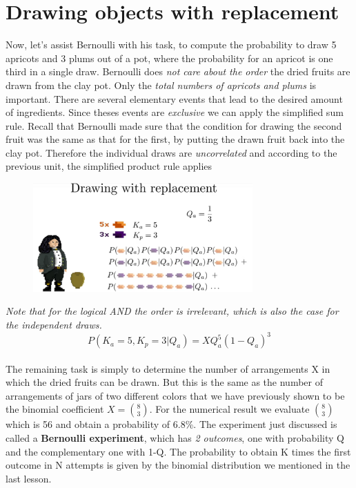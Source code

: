 \documentclass[12pt, a4paper]{scrartcl}
\begin{document}
\section*{Drawing objects with replacement}
Now, let’s assist Bernoulli with his task, to compute the probability to draw 5 apricots and 3 plums out of a pot, where the probability for an apricot is one third in a single draw.
Bernoulli does \textit{not care about the order} the dried fruits are drawn from the clay pot. Only the \textit{total numbers of apricots and plums} is important. There are several elementary events that lead to the desired amount of ingredients.
Since theses events are \textit{exclusive} we can apply the simplified sum rule.
Recall that Bernoulli made sure that the condition for drawing the second fruit was the same as that for the first, by putting the drawn fruit back into the clay pot. 
Therefore the individual draws are \textit{uncorrelated} and according to the previous unit, the simplified product rule applies\\
 \begin{figure}[H]
	\centering
	\includegraphics[width=0.75\textwidth]{4_5.png}
\end{figure}
\textit{Note that for the logical AND the order is irrelevant, which is also the case for the independent draws.}
\begin{equation*}\boxed{P(K_a=5,K_p=3|Q_a)=XQ_a^5(1-Q_a)^3
}\end{equation*}\\
The remaining task is simply to determine the number of arrangements X in which the dried fruits can be drawn. But this is the same as the number of arrangements of jars of two different colors that we have previously shown to be the binomial coefficient $X={8 \choose 3}$.
For the numerical result we evaluate ${8 \choose 3}$ which is 56 and obtain a probability of 6.8\%.
The experiment just discussed is called a \textbf{Bernoulli experiment}, which has \textit{2 outcomes}, one with probability Q and the complementary one with 1-Q.
The probability to obtain K times the first outcome in N attempts is given by the binomial distribution we mentioned in the last lesson.\\
\end{document}
